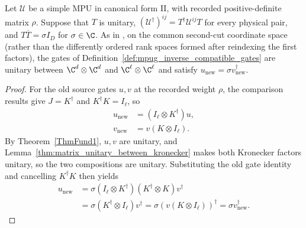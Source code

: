 \begin{lemma}
    \label{thm:mpug_inverse_new_gates_unitary_phase}
    \leanok
    Let $\mathcal U$ be a simple MPU in canonical form II, with recorded
    positive-definite matrix $\rho$. Suppose that $T$ is unitary,
    $(\mathcal U^\dagger)^{ij}=T^\dagger\mathcal U^{ij}T$ for every
    physical pair, and $T\overline T=\sigma I_D$ for $\sigma\in\C$.
    As in \cite[lines~5440--5487]{FrancoRubio2025MPUGauging}, on the common
    second-cut coordinate space (rather than the differently ordered rank
    spaces formed after reindexing the first factors), the gates of
    Definition~\ref{def:mpug_inverse_compatible_gates} are unitary between
    $\C^d\otimes\C^d$ and $\C^\ell\otimes\C^\ell$ and satisfy
    $u_{\mathrm{new}}=\sigma v_{\mathrm{new}}^\dagger$.
\end{lemma}
\begin{proof}\leanok
    For the old source gates $u,v$ at the recorded weight $\rho$, the
    comparison results give $J=K^\dagger$ and $K^\dagger K=I_\ell$, so
    \begin{align}
        u_{\mathrm{new}} & =(I_\ell\otimes K^\dagger)u, \\
        v_{\mathrm{new}} & =v(K\otimes I_\ell).
    \end{align}
    By Theorem~\ref{ThmFund1}, $u,v$ are unitary, and
    Lemma~\ref{thm:matrix_unitary_between_kronecker} makes both Kronecker
    factors unitary, so the two compositions are unitary. Substituting the old
    gate identity and cancelling $K^\dagger K$ then yields
    \begin{align}
        u_{\mathrm{new}}
         & =\sigma(I_\ell\otimes K^\dagger)
        (K^\dagger\otimes K)v^\dagger                \\
         & =\sigma(K^\dagger\otimes I_\ell)v^\dagger
        =\sigma(v(K\otimes I_\ell))^\dagger
        =\sigma v_{\mathrm{new}}^\dagger.
    \end{align}
\end{proof}

